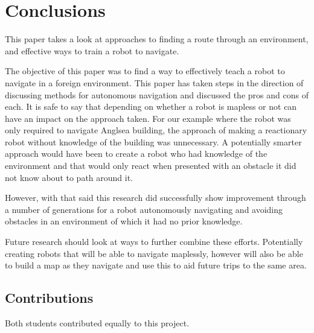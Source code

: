 \section{Conclusions}
This paper takes a look at approaches to finding a route through an environment, and effective ways to train a robot to navigate. 

The objective of this paper was to find a way to effectively teach a robot to navigate in a foreign environment. This paper has taken steps in the direction of discussing methods for autonomous navigation and discussed the pros and cons of each. It is safe to say that depending on whether a robot is mapless or not can have an impact on the approach taken. For our example where the robot was only required to navigate Anglsea building, the approach of making a reactionary robot without knowledge of the building was unnecessary. A potentially smarter approach would have been to create a robot who had knowledge of the environment and that would only react when presented with an obstacle it did not know about to path around it.

However, with that said this research did successfully show improvement through a number of generations for a robot autonomously navigating and avoiding obstacles in an environment of which it had no prior knowledge.

Future research should look at ways to further combine these efforts. Potentially creating robots that will be able to navigate maplessly, however will also be able to build a map as they navigate and use this to aid future trips to the same area.

\subsection{Contributions}
Both students contributed equally to this project.